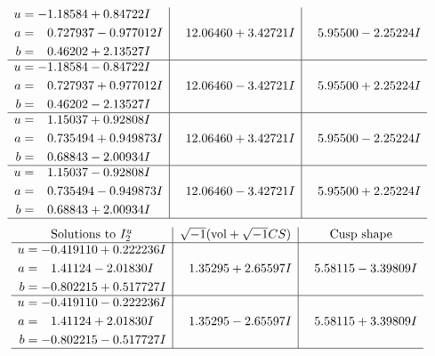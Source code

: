 \documentclass[1p]{elsarticle_modified}
\theoremstyle{definition}
\newcommand{\I}{\sqrt{-1}}
\begin{document}
$$\begin{array}{c|c|c}
\begin{aligned}
u &= -1.18584 + 0.84722 I \\
a &= \phantom{-}0.727937 - 0.977012 I \\
b &= \phantom{-}0.46202 + 2.13527 I\end{aligned}
 & \phantom{-}12.06460 + 3.42721 I & \phantom{-}5.95500 - 2.25224 I \\ \hline\begin{aligned}
u &= -1.18584 - 0.84722 I \\
a &= \phantom{-}0.727937 + 0.977012 I \\
b &= \phantom{-}0.46202 - 2.13527 I\end{aligned}
 & \phantom{-}12.06460 - 3.42721 I & \phantom{-}5.95500 + 2.25224 I \\ \hline\begin{aligned}
u &= \phantom{-}1.15037 + 0.92808 I \\
a &= \phantom{-}0.735494 + 0.949873 I \\
b &= \phantom{-}0.68843 - 2.00934 I\end{aligned}
 & \phantom{-}12.06460 + 3.42721 I & \phantom{-}5.95500 - 2.25224 I \\ \hline\begin{aligned}
u &= \phantom{-}1.15037 - 0.92808 I \\
a &= \phantom{-}0.735494 - 0.949873 I \\
b &= \phantom{-}0.68843 + 2.00934 I\end{aligned}
 & \phantom{-}12.06460 - 3.42721 I & \phantom{-}5.95500 + 2.25224 I\\
 \hline 
 \end{array}$$\newpage$$\begin{array}{c|c|c}  
\text{Solutions to }I^u_{2}& \I (\text{vol} + \sqrt{-1}CS) & \text{Cusp shape}\\
 \hline 
\begin{aligned}
u &= -0.419110 + 0.222236 I \\
a &= \phantom{-}1.41124 - 2.01830 I \\
b &= -0.802215 + 0.517727 I\end{aligned}
 & \phantom{-}1.35295 + 2.65597 I & \phantom{-}5.58115 - 3.39809 I \\ \hline\begin{aligned}
u &= -0.419110 - 0.222236 I \\
a &= \phantom{-}1.41124 + 2.01830 I \\
b &= -0.802215 - 0.517727 I\end{aligned}
 & \phantom{-}1.35295 - 2.65597 I & \phantom{-}5.58115 + 3.39809 I\\
 \hline 
 \end{array}$$\newpage\newpage\renewcommand{\arraystretch}{1}
\end{document}
